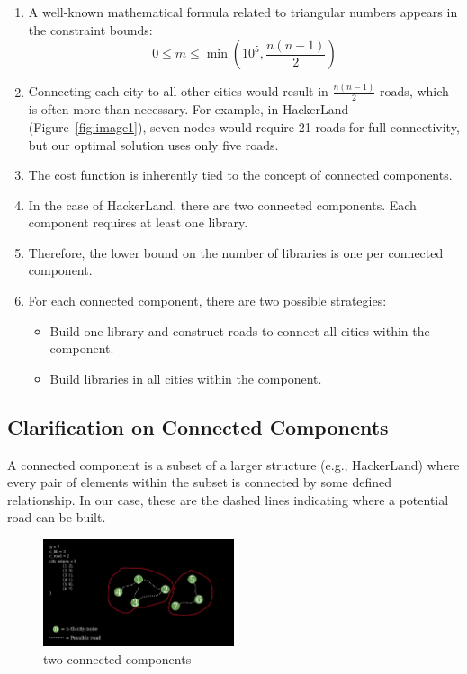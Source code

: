 \documentclass[11pt, a4paper, oneside]{article}
\begin{document}
\begin{enumerate}
  \item A well-known mathematical formula related to triangular numbers \cite{triangularnumber} appears in the constraint bounds:
    \[
    0 \leq m \leq \min \left(10^{5}, \frac{n(n - 1)}{2}\right)
    \]
  \item Connecting each city to all other cities would result in \(\frac{n(n - 1)}{2}\) roads, which is often more than necessary. For example, in HackerLand (Figure~\ref{fig:image1}), seven nodes would require 21 roads for full connectivity, but our optimal solution uses only five roads.
  \item The cost function is inherently tied to the concept of connected components.
  \item In the case of HackerLand, there are two connected components. Each component requires at least one library.
  \item Therefore, the lower bound on the number of libraries is one per connected component.
  \item For each connected component, there are two possible strategies:
    \begin{itemize}
      \item Build one library and construct roads to connect all cities within the component.
      \item Build libraries in all cities within the component.
    \end{itemize}
\end{enumerate}

\subsection*{Clarification on Connected Components}

A connected component \cite{graphcomponent} is a subset of a larger structure (e.g., HackerLand) where every pair of elements within the subset is connected by some defined relationship. In our case, these are the dashed lines indicating where a potential road can be built.

\begin{figure}[H]
  \centering
  \includegraphics[width=0.5\textwidth]{connected-component-example.png}
  \caption{two connected components}
  \label{fig:image3}
\end{figure}
\end{document}

